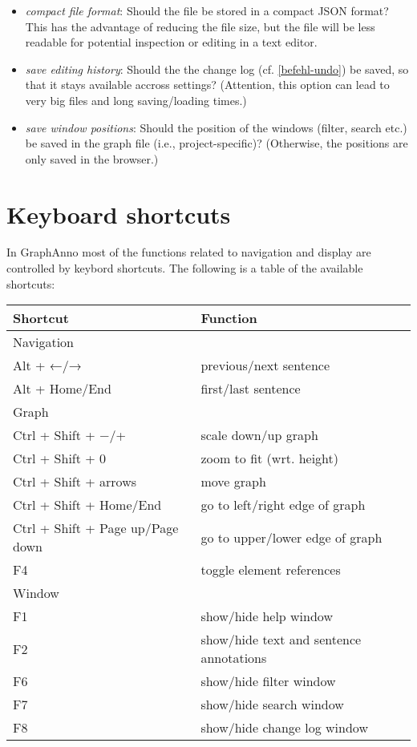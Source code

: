 \documentclass[12pt]{scrartcl}
\newcommand{\code}[1]{\hl{\texttt{#1}}}
\begin{document}
\begin{itemize}
	\item	\textit{compact file format}: Should the file be stored in a compact JSON format?
			This has the advantage of reducing the file size, but the file will be less readable for potential inspection or editing in a text editor.
	\item	\textit{save editing history}: Should the the change log (cf. \ref{befehl-undo}) be saved, so that it stays available accross settings?
			(Attention, this option can lead to very big files and long saving/loading times.)
	\item	\textit{save window positions}: Should the position of the windows (filter, search etc.) be saved in the graph file (i.e., project-specific)?
			(Otherwise, the positions are only saved in the browser.)
\end{itemize}



\section{Keyboard shortcuts}

In GraphAnno most of the functions related to navigation and display are controlled by keybord shortcuts.
The following is a table of the available shortcuts:

\begin{center}
	\begin{tabular*}{\textwidth}{ll}
		\toprule
		Shortcut & Function \\
		\midrule
		Navigation & \\
		\midrule
			Alt + ←/→ & previous/next sentence\\
			Alt + Home/End & first/last sentence \\
		\midrule
		Graph & \\
		\midrule
			Ctrl + Shift + −/+ & scale down/up graph\\
			Ctrl + Shift + 0 & zoom to fit (wrt. height) \\
			Ctrl + Shift + arrows & move graph\\
			Ctrl + Shift + Home/End & go to left/right edge of graph\\
			Ctrl + Shift + Page up/Page down& go to upper/lower edge of graph\\
			F4 & toggle element references\\
		\midrule
		Window & \\
		\midrule
			F1 & show/hide help window \\
			F2 & show/hide text and sentence annotations\\
			F6 & show/hide filter window\\
			F7 & show/hide search window\\
			F8 & show/hide change log window\\
		\bottomrule
	\end{tabular*}
\end{center}
\end{document}
